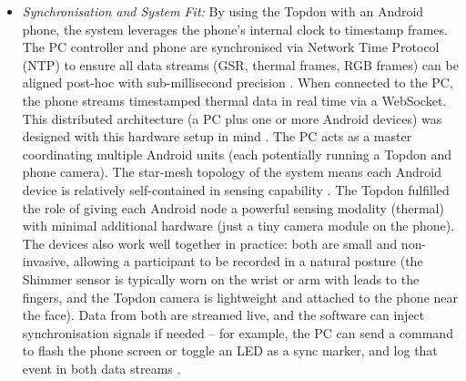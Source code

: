 \begin{itemize}
    \item \emph{Synchronisation and System Fit:} By using the Topdon with an Android phone, the system leverages the phone's internal clock to timestamp frames. The PC controller and phone are synchronised via Network Time Protocol (NTP) to ensure all data streams (GSR, thermal frames, RGB frames) can be aligned post-hoc with sub-millisecond precision \cite{ref15}. When connected to the PC, the phone streams timestamped thermal data in real time via a WebSocket. This distributed architecture (a PC plus one or more Android devices) was designed with this hardware setup in mind \cite{ref15}. The PC acts as a master coordinating multiple Android units (each potentially running a Topdon and phone camera). The star-mesh topology of the system means each Android device is relatively self-contained in sensing capability \cite{ref15}. The Topdon fulfilled the role of giving each Android node a powerful sensing modality (thermal) with minimal additional hardware (just a tiny camera module on the phone). The devices also work well together in practice: both are small and non-invasive, allowing a participant to be recorded in a natural posture (the Shimmer sensor is typically worn on the wrist or arm with leads to the fingers, and the Topdon camera is lightweight and attached to the phone near the face). Data from both are streamed live, and the software can inject synchronisation signals if needed -- for example, the PC can send a command to flash the phone screen or toggle an LED as a sync marker, and log that event in both data streams \cite{ref21}.
\end{itemize}
